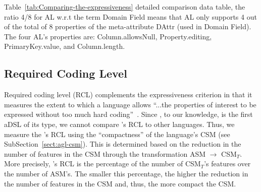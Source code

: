 Table~\ref{tab:Comparing-the-expressiveness} detailed comparison data table, the ratio 4/8 for AL w.r.t the term Domain Field means that AL only supports 4 out of the total of 8 properties of the meta-attribute DAttr (used in Domain Field). The four AL’s properties are: Column.allowsNull, Property.editing, PrimaryKey.value, and Column.length.
%
%
\subsection{Required Coding Level} \label{sect:eval-rcl}
Required coding level (RCL) complements the expressiveness criterion in that it measures the extent to which a language allows ``...the properties of interest to be expressed without too much hard coding''~\cite{lamsweerde_formal_2000}.
Since \agl, to our knowledge, is the first aDSL of its type, we cannot compare \agl's RCL to other languages. Thus, we measure the \agl's RCL using the ``compactness'' of the language's CSM (see SubSection~\ref{sect:agl-csm}). This is determined based on the reduction in the number of features in the CSM through the transformation ASM $\rightarrow$ CSM$_T$. More precisely, \agl's RCL is the percentage of the number of CSM$_T$'s features over the number of ASM's. The smaller this percentage, the higher the reduction in the number of features in the CSM and, thus, the more compact the CSM.
%

